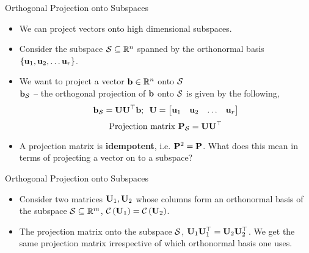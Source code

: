 \documentclass[aspectratio=169]{beamer}
\let\olditem\item
\renewcommand{\item}{\setlength{\itemsep}{\fill}\olditem}
\def\mf{\ensuremath\mathbf}
\def\mb{\ensuremath\mathbb}
\def\mc{\ensuremath\mathcal}
\def\lp{\ensuremath\left(}
\def\rp{\ensuremath\right)}
\begin{document}
\begin{frame}[t]{Orthogonal Projection onto Subspaces}
\begin{itemize}
    \item We can project vectors onto high dimensional subspaces.
    \item Consider the subspace $\mc{S} \subseteq \mb{R}^n$ spanned by the orthonormal basis $\left\{\mf{u}_1, \mf{u}_2, \ldots \mf{u}_r\right\}$.\\

    \item We want to project a vector $\mf{b} \in\mb{R}^n$ onto $\mc{S}$ \\
    $\mf{b}_{\mc{S}}$ -- the orthogonal projection of $\mf{b}$ onto $\mc{S}$ is given by the following,
    \[ \mf{b}_{\mc{S}} = \mf{UU}^\top\mf{b}; \,\,\, \mf{U} = \begin{bmatrix}\mf{u}_1 & \mf{u}_2 & \ldots & \mf{u}_r \end{bmatrix} \]
    \[ \text{Projection matrix } \mf{P}_{\mc{S}} = \mf{UU}^\top \]
    \item A projection matrix is \textbf{idempotent}, i.e. $\mf{P}^2 = \mf{P}$. What does this mean in terms of projecting a vector on to a subspace?
\end{itemize}

\end{frame}


\begin{frame}[t]{Orthogonal Projection onto Subspaces}

\begin{itemize}
    \item Consider two matrices $\mf{U}_1, \mf{U}_2$ whose columns form an  orthonormal basis of the subspace $\mc{S} \subseteq \mb{R}^m $, $\mc{C}\lp\mf{U}_1\rp = \mc{C}\lp\mf{U}_2\rp$.

    \item The projection matrix onto the subspace $\mc{S}$, $\mf{U}_1\mf{U}_1^\top = \mf{U}_2\mf{U}_2^\top$. We get the same projection matrix irrespective of which orthonormal basis one uses.
\end{itemize}
\end{frame}
\end{document}
